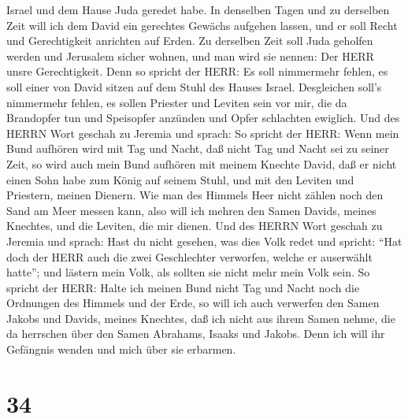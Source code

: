 Israel und dem Hause Juda geredet habe.  In denselben Tagen
und zu derselben Zeit will ich dem David ein gerechtes Gewächs aufgehen
lassen, und er soll Recht und Gerechtigkeit anrichten auf Erden.
 Zu derselben Zeit soll Juda geholfen werden und Jerusalem
sicher wohnen, und man wird sie nennen: Der HERR unsre Gerechtigkeit.
 Denn so spricht der HERR: Es soll nimmermehr fehlen, es
soll einer von David sitzen auf dem Stuhl des Hauses Israel.
 Desgleichen soll's nimmermehr fehlen, es sollen Priester
und Leviten sein vor mir, die da Brandopfer tun und Speisopfer anzünden
und Opfer schlachten ewiglich.  Und des HERRN Wort geschah
zu Jeremia und sprach:  So spricht der HERR: Wenn mein Bund
aufhören wird mit Tag und Nacht, daß nicht Tag und Nacht sei zu seiner
Zeit,  so wird auch mein Bund aufhören mit meinem Knechte
David, daß er nicht einen Sohn habe zum König auf seinem Stuhl, und mit
den Leviten und Priestern, meinen Dienern.  Wie man des
Himmels Heer nicht zählen noch den Sand am Meer messen kann, also will
ich mehren den Samen Davids, meines Knechtes, und die Leviten, die mir
dienen.  Und des HERRN Wort geschah zu Jeremia und sprach:
 Hast du nicht gesehen, was dies Volk redet und spricht:
``Hat doch der HERR auch die zwei Geschlechter verworfen, welche er
auserwählt hatte''; und lästern mein Volk, als sollten sie nicht mehr
mein Volk sein.  So spricht der HERR: Halte ich meinen Bund
nicht Tag und Nacht noch die Ordnungen des Himmels und der Erde,
 so will ich auch verwerfen den Samen Jakobs und Davids,
meines Knechtes, daß ich nicht aus ihrem Samen nehme, die da herrschen
über den Samen Abrahams, Isaaks und Jakobs. Denn ich will ihr Gefängnis
wenden und mich über sie erbarmen.

\hypertarget{section-33}{%
\section{34}\label{section-33}}

